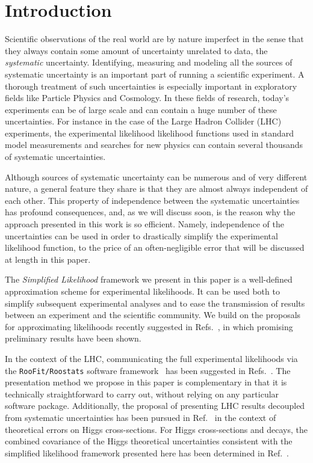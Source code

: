\documentclass[11pt]{article}
\begin{document}
\noindent
\newpage




\section{Introduction}


Scientific observations of the real world are by nature imperfect in the sense that they always contain some amount of
 uncertainty unrelated to data, the \textit{systematic}   uncertainty. Identifying, measuring and modeling all the sources of systematic uncertainty is an important part of running a scientific experiment. A thorough treatment of such uncertainties is especially important in exploratory fields like Particle Physics and Cosmology. In these fields of research,  %
today's experiments  can be of large scale and can contain a huge number of these  uncertainties. For instance in the case of the Large Hadron Collider (LHC) experiments, the experimental likelihood likelihood functions used in standard model measurements and searches for new physics can contain several thousands of systematic uncertainties.

Although sources of systematic uncertainty can be numerous and of very different nature, a general feature they share is that they are almost always independent of each other. This property of independence between the systematic uncertainties has profound consequences, and, as we will discuss soon, is the reason why the approach presented in this work is so efficient. Namely, independence of the uncertainties can be used in order to drastically simplify the experimental likelihood function, to the price of an often-negligible error that will be discussed at length in this paper.

The \textit{Simplified Likelihood} framework we present in this paper is a well-defined approximation scheme for experimental likelihoods. It can be used both to simplify subsequent experimental analyses and to ease the transmission of results between an experiment and the scientific community.
We build on the proposals for approximating likelihoods recently suggested in Refs.~\cite{Fichet:2016gvx,SL_note}, in which promising preliminary results have been shown.

In the context of the LHC, communicating the full experimental likelihoods via the \texttt{RooFit/Roostats} software framework~\cite{Verkerke:2003ir,Moneta:2010pm} has been suggested in Refs.~\cite{Kraml:2012sg,Boudjema:2013qla}. The presentation method we propose in this paper is complementary in that it is technically straightforward to carry out, without relying on any
particular software package. Additionally, the proposal of presenting LHC results decoupled from systematic uncertainties has been pursued in Ref.~\cite{Cranmer:2013hia} in the context of theoretical errors on Higgs cross-sections. For Higgs cross-sections and decays, the combined covariance of the Higgs theoretical uncertainties consistent with the simplified likelihood framework presented here has been determined in Ref.~\cite{Arbey:2016kqi}.
\end{document}
